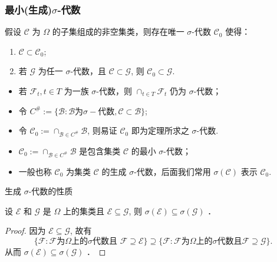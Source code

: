 \documentclass[Prob-All.tex]{subfiles}
\begin{document}
\begin{frame}
	\frametitle{最小(生成)$\sigma$-代数}
	\begin{thm}
		假设 $\mathcal{C}$ 为 $\Omega$ 的子集组成的非空集类，则存在唯一 $\sigma$-代数 $\mathcal{C}_0$ 使得：
		\begin{enumerate}[<+-|alert@+>][(1)]
			\item $\mathcal{C}\subset \mathcal{C}_0$;
			\item 若 $\mathcal{G}$ 为任一 $\sigma$-代数，且 $\mathcal{C}\subset \mathcal{G}$, 则 $\mathcal{C}_0\subset \mathcal{G}$.
		\end{enumerate}
	\end{thm}

	\pause
	\zheng
	\begin{itemize}[<+-|alert@+>]
		\item 若 $\mathcal{F}_t, t\in T$ 为一族 $\sigma$-代数，则 $\cap_{t\in T}\mathcal{F}_t$ 仍为 $\sigma$-代数；
		\item 令 $C^{\#}:=\{\mathcal{B}:\mathcal{B}\mbox{为}\sigma-\mbox{代数}, \mathcal{C}\subset \mathcal{B}\}$;

		\item 令 $\mathcal{C}_0:=\cap_{\mathcal{B}\in C^{\#}}\mathcal{B}$, 则易证 $\mathcal{C}_0$ 即为定理所求之 $\sigma$-代数.
	\end{itemize}

	\pause
	\begin{rmk}
		\begin{itemize}[<+-|alert@+>]
			\item $\mathcal{C}_0:=\cap_{\mathcal{B}\in C^{\#}}\mathcal{B}$ 是包含集类 $\mathcal{C}$ 的最小 $\sigma$-代数；
			\item 一般也称 $\mathcal{C}_0$ 为集类 $\mathcal{C}$ 的生成 $\sigma$-代数，后面我们常用 $\sigma (\mathcal{C})$ 表示 $\mathcal{C}_0$.
		\end{itemize}
	\end{rmk}
\end{frame}





\begin{frame}{生成 $\sigma$-代数的性质}
\begin{prop}
设 $\mathcal{E}$ 和 $\mathcal{G}$ 是 $\Omega$ 上的集类且 $\mathcal{E} \subseteq \mathcal{G}$, 则 $\sigma(\mathcal{E}) \subseteq \sigma(\mathcal{G})$ ．
\end{prop}

\pause

\vspace{0.5cm}
\begin{proof}
因为 $\mathcal{E} \subseteq \mathcal{G}$, 故有\pause
$$\{\mathcal{F}: \mathcal{F} \text{为} \Omega \text{上的} \sigma \text{代数且 } \mathcal{F} \supseteq \mathcal{E}\} \supseteq\{\mathcal{F}: \mathcal{F}\text{为} \Omega \text{上的} \sigma \text{代数且} \mathcal{F} \supseteq \mathcal{G}\}.$$
\pause
从而 $\sigma(\mathcal{E}) \subseteq \sigma(\mathcal{G})$ ．
\end{proof}



\end{frame}
\end{document}
